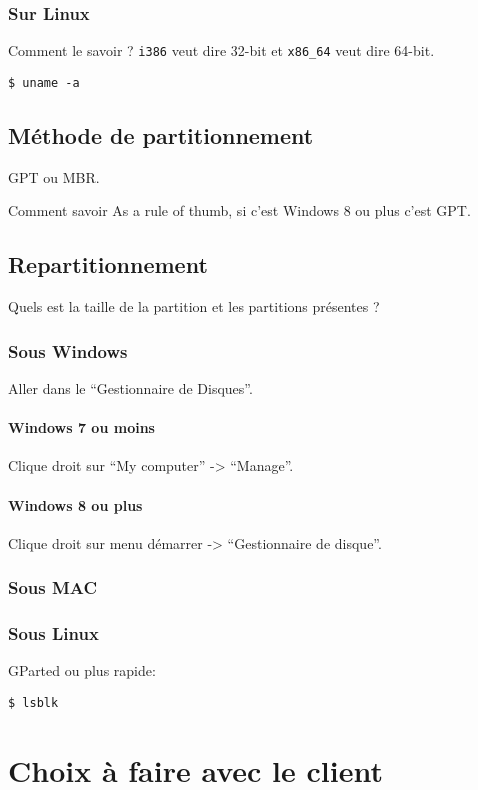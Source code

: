 \documentclass{../guide}
\begin{document}
\subsubsection{Sur Linux}
Comment le savoir ? \verb|i386| veut dire 32-bit et \verb|x86_64| veut dire 64-bit.
\begin{verbatim}
$ uname -a
\end{verbatim}

\subsection{Méthode de partitionnement}
GPT ou MBR.

Comment savoir 
As a rule of thumb, si c'est Windows 8 ou plus c'est GPT.

\subsection{Repartitionnement}
Quels est la taille de la partition et les partitions présentes ?
\subsubsection{Sous Windows}
Aller dans le ``Gestionnaire de Disques''.
\paragraph{Windows 7 ou moins}
Clique droit sur ``My computer'' -> ``Manage''.
\paragraph{Windows 8 ou plus}
Clique droit sur menu démarrer -> ``Gestionnaire de disque''.
\subsubsection{Sous MAC}
\subsubsection{Sous Linux}
GParted ou plus rapide:
\begin{verbatim}
$ lsblk
\end{verbatim}

\section{Choix à faire avec le client}
\end{document}
